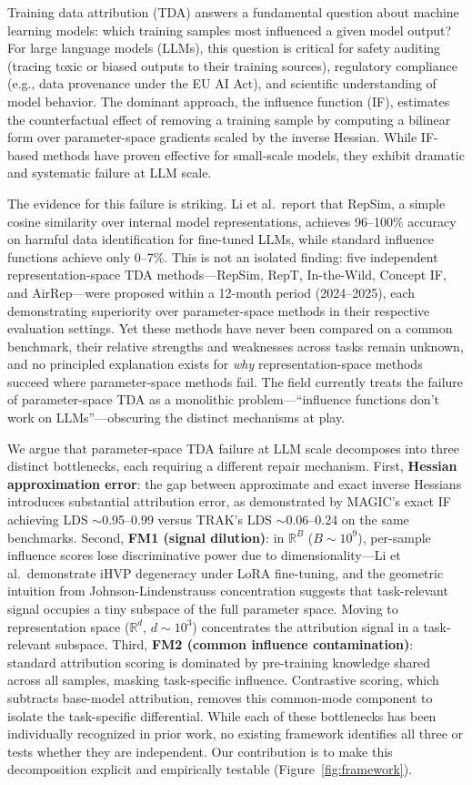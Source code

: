 \documentclass{article}
\begin{document}
Training data attribution (TDA) answers a fundamental question about machine learning models: which training samples most influenced a given model output? For large language models (LLMs), this question is critical for safety auditing (tracing toxic or biased outputs to their training sources), regulatory compliance (e.g., data provenance under the EU AI Act), and scientific understanding of model behavior. The dominant approach, the influence function (IF), estimates the counterfactual effect of removing a training sample by computing a bilinear form over parameter-space gradients scaled by the inverse Hessian. While IF-based methods have proven effective for small-scale models, they exhibit dramatic and systematic failure at LLM scale.

The evidence for this failure is striking. Li et al.\ report that RepSim, a simple cosine similarity over internal model representations, achieves 96--100\% accuracy on harmful data identification for fine-tuned LLMs, while standard influence functions achieve only 0--7\%. This is not an isolated finding: five independent representation-space TDA methods---RepSim, RepT, In-the-Wild, Concept IF, and AirRep---were proposed within a 12-month period (2024--2025), each demonstrating superiority over parameter-space methods in their respective evaluation settings. Yet these methods have never been compared on a common benchmark, their relative strengths and weaknesses across tasks remain unknown, and no principled explanation exists for \emph{why} representation-space methods succeed where parameter-space methods fail. The field currently treats the failure of parameter-space TDA as a monolithic problem---``influence functions don't work on LLMs''---obscuring the distinct mechanisms at play.

We argue that parameter-space TDA failure at LLM scale decomposes into three distinct bottlenecks, each requiring a different repair mechanism. First, \textbf{Hessian approximation error}: the gap between approximate and exact inverse Hessians introduces substantial attribution error, as demonstrated by MAGIC's exact IF achieving LDS $\sim$0.95--0.99 versus TRAK's LDS $\sim$0.06--0.24 on the same benchmarks. Second, \textbf{FM1 (signal dilution)}: in $\mathbb{R}^B$ ($B \sim 10^9$), per-sample influence scores lose discriminative power due to dimensionality---Li et al.\ demonstrate iHVP degeneracy under LoRA fine-tuning, and the geometric intuition from Johnson-Lindenstrauss concentration suggests that task-relevant signal occupies a tiny subspace of the full parameter space. Moving to representation space ($\mathbb{R}^d$, $d \sim 10^3$) concentrates the attribution signal in a task-relevant subspace. Third, \textbf{FM2 (common influence contamination)}: standard attribution scoring is dominated by pre-training knowledge shared across all samples, masking task-specific influence. Contrastive scoring, which subtracts base-model attribution, removes this common-mode component to isolate the task-specific differential. While each of these bottlenecks has been individually recognized in prior work, no existing framework identifies all three or tests whether they are independent. Our contribution is to make this decomposition explicit and empirically testable (Figure~\ref{fig:framework}).
\end{document}
